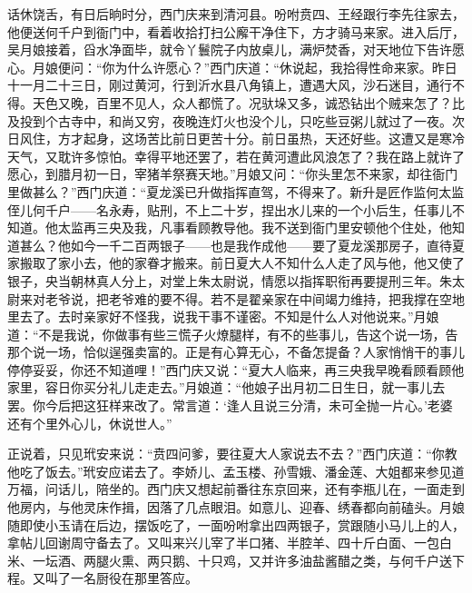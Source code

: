话休饶舌，有日后晌时分，西门庆来到清河县。吩咐贲四、王经跟行李先往家去，他便送何千户到衙门中，看着收拾打扫公廨干净住下，方才骑马来家。进入后厅，吴月娘接着，舀水净面毕，就令丫鬟院子内放桌儿，满炉焚香，对天地位下告许愿心。月娘便问：“你为什么许愿心？”西门庆道：“休说起，我拾得性命来家。昨日十一月二十三日，刚过黄河，行到沂水县八角镇上，遭遇大风，沙石迷目，通行不得。天色又晚，百里不见人，众人都慌了。况驮垛又多，诚恐钻出个贼来怎了？比及投到个古寺中，和尚又穷，夜晚连灯火也没个儿，只吃些豆粥儿就过了一夜。次日风住，方才起身，这场苦比前日更苦十分。前日虽热，天还好些。这遭又是寒冷天气，又耽许多惊怕。幸得平地还罢了，若在黄河遭此风浪怎了？我在路上就许了愿心，到腊月初一日，宰猪羊祭赛天地。”月娘又问：“你头里怎不来家，却往衙门里做甚么？”西门庆道：“夏龙溪已升做指挥直驾，不得来了。新升是匠作监何太监侄儿何千户——名永寿，贴刑，不上二十岁，捏出水儿来的一个小后生，任事儿不知道。他太监再三央及我，凡事看顾教导他。我不送到衙门里安顿他个住处，他知道甚么？他如今一千二百两银子——也是我作成他——要了夏龙溪那房子，直待夏家搬取了家小去，他的家眷才搬来。前日夏大人不知什么人走了风与他，他又使了银子，央当朝林真人分上，对堂上朱太尉说，情愿以指挥职衔再要提刑三年。朱太尉来对老爷说，把老爷难的要不得。若不是翟亲家在中间竭力维持，把我撑在空地里去了。去时亲家好不怪我，说我干事不谨密。不知是什么人对他说来。”月娘道：“不是我说，你做事有些三慌子火燎腿样，有不的些事儿，告这个说一场，告那个说一场，恰似逞强卖富的。正是有心算无心，不备怎提备？人家悄悄干的事儿停停妥妥，你还不知道哩！”西门庆又说：“夏大人临来，再三央我早晚看顾看顾他家里，容日你买分礼儿走走去。”月娘道：“他娘子出月初二日生日，就一事儿去罢。你今后把这狂样来改了。常言道：‘逢人且说三分清，未可全抛一片心。’老婆还有个里外心儿，休说世人。”

正说着，只见玳安来说：“贲四问爹，要往夏大人家说去不去？”西门庆道：“你教他吃了饭去。”玳安应诺去了。李娇儿、孟玉楼、孙雪娥、潘金莲、大姐都来参见道万福，问话儿，陪坐的。西门庆又想起前番往东京回来，还有李瓶儿在，一面走到他房内，与他灵床作揖，因落了几点眼泪。如意儿、迎春、绣春都向前磕头。月娘随即使小玉请在后边，摆饭吃了，一面吩咐拿出四两银子，赏跟随小马儿上的人，拿帖儿回谢周守备去了。又叫来兴儿宰了半口猪、半腔羊、四十斤白面、一包白米、一坛酒、两腿火熏、两只鹅、十只鸡，又并许多油盐酱醋之类，与何千户送下程。又叫了一名厨役在那里答应。

